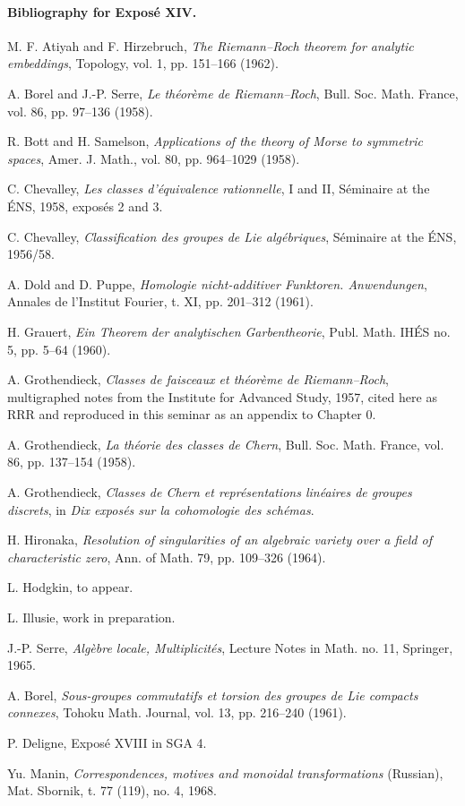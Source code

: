 \documentclass[11pt]{article}
\theoremstyle{plain}
\theoremstyle{definition}
\theoremstyle{remark}
\begin{document}
\paragraph{Bibliography for Exposé XIV.}
\begin{enumerate}[label={[\arabic*]}]
\item M. F. Atiyah and F. Hirzebruch, \emph{The Riemann--Roch theorem for analytic embeddings}, Topology, vol. 1, pp. 151--166 (1962).
\item A. Borel and J.-P. Serre, \emph{Le théorème de Riemann--Roch}, Bull. Soc. Math. France, vol. 86, pp. 97--136 (1958).
\item R. Bott and H. Samelson, \emph{Applications of the theory of Morse to symmetric spaces}, Amer. J. Math., vol. 80, pp. 964--1029 (1958).
\item C. Chevalley, \emph{Les classes d'équivalence rationnelle}, I and II, Séminaire at the ÉNS, 1958, exposés 2 and 3.
\item C. Chevalley, \emph{Classification des groupes de Lie algébriques}, Séminaire at the ÉNS, 1956/58.
\item A. Dold and D. Puppe, \emph{Homologie nicht-additiver Funktoren. Anwendungen}, Annales de l'Institut Fourier, t. XI, pp. 201--312 (1961).
\item H. Grauert, \emph{Ein Theorem der analytischen Garbentheorie}, Publ. Math. IHÉS no. 5, pp. 5--64 (1960).
\item A. Grothendieck, \emph{Classes de faisceaux et théorème de Riemann--Roch}, multigraphed notes from the Institute for Advanced Study, 1957, cited here as RRR and reproduced in this seminar as an appendix to Chapter 0.
\item A. Grothendieck, \emph{La théorie des classes de Chern}, Bull. Soc. Math. France, vol. 86, pp. 137--154 (1958).
\item A. Grothendieck, \emph{Classes de Chern et représentations linéaires de groupes discrets}, in \emph{Dix exposés sur la cohomologie des schémas}.
\item H. Hironaka, \emph{Resolution of singularities of an algebraic variety over a field of characteristic zero}, Ann. of Math. 79, pp. 109--326 (1964).
\item L. Hodgkin, to appear.
\item L. Illusie, work in preparation.
\item J.-P. Serre, \emph{Algèbre locale, Multiplicités}, Lecture Notes in Math. no. 11, Springer, 1965.
\item A. Borel, \emph{Sous-groupes commutatifs et torsion des groupes de Lie compacts connexes}, Tohoku Math. Journal, vol. 13, pp. 216--240 (1961).
\item P. Deligne, Exposé XVIII in SGA 4.
\item Yu. Manin, \emph{Correspondences, motives and monoidal transformations} (Russian), Mat. Sbornik, t. 77 (119), no. 4, 1968.
\end{enumerate}
\end{document}
